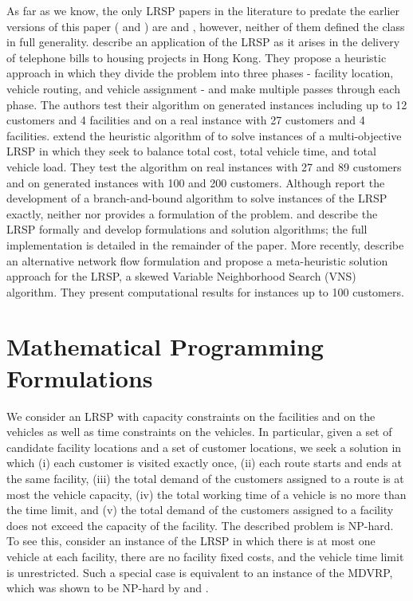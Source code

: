 \documentclass[11pt]{article}
\begin{document}
As far as we know, the only LRSP papers in the literature to predate the 
earlier versions of this paper (\cite{Akca2} and \cite{Akca}) are \cite{Lin} 
and \cite{Lin2}, however, 
neither of them defined the class in full generality.
\cite{Lin} describe an application of the LRSP as
it arises in the delivery of telephone bills to housing projects in
Hong Kong.  They propose a heuristic approach in which they divide the problem into three
phases - facility location, vehicle routing, and vehicle assignment - 
and make multiple passes through each phase.  The authors test their algorithm
on generated instances including up to 12 customers and 4 facilities and on a
real instance with 27 customers and 4 facilities. 
\cite{Lin2} extend the heuristic algorithm of \cite{Lin} to 
solve instances of a multi-objective LRSP in which they seek to balance 
total cost, total vehicle time, and total vehicle load.  They test the algorithm on real 
instances with 27 and 89 customers and on generated instances with
100 and 200 customers.  Although \cite{Lin} report the development of a branch-and-bound
algorithm to solve instances of the LRSP exactly, neither \cite{Lin}
nor \cite{Lin2} provides a formulation of the problem.
\cite{Akca2} and \cite{Akca} describe the LRSP formally and develop formulations and solution algorithms; the full implementation is detailed in the 
remainder of the paper. More recently, \cite{Macedo14} describe an alternative network flow formulation and \cite{Macedo15} propose a meta-heuristic solution approach for the LRSP, a skewed Variable Neighborhood Search (VNS) algorithm. They present computational results for instances up to 100 customers. 


\section{Mathematical Programming Formulations}
\label{sec:models}
We consider an LRSP with capacity constraints
on the facilities and on the vehicles as well as time constraints on the vehicles.
In particular, given a set of candidate facility locations and a set of
customer locations, we seek a solution in which (i) each customer is visited exactly once, 
(ii) each route starts and ends at the same facility, (iii) the 
total demand of the customers assigned to a route is at most the vehicle 
capacity, (iv) the total working time of a vehicle is no more than the  
time limit, and (v) the total demand of the customers assigned to a facility 
does not exceed the capacity of the facility. 
The described problem is NP-hard.  To see this, consider an instance of the LRSP in which 
there is at most one vehicle
at each facility, there are no facility fixed costs, and the vehicle time limit is unrestricted.
Such a special case is equivalent to an instance of the MDVRP, which was shown to be
NP-hard by \cite{Bodin2} and \cite{Lenstra}.
\end{document}
